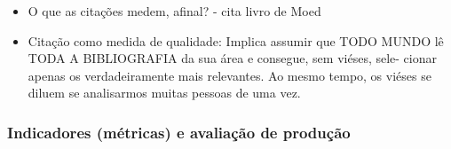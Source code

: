 \documentclass[11pt]{article}
\begin{document}
\begin{itemize}
\item O que as citações medem, afinal? \cite{pendlebury2009} - cita livro de Moed \cite{moed2006}

\item Citação como medida de qualidade: Implica assumir que TODO MUNDO lê TODA A BIBLIOGRAFIA da sua área e consegue, sem viéses, sele- cionar apenas os verdadeiramente mais relevantes. Ao mesmo tempo, os viéses se diluem se analisarmos muitas pessoas de uma vez.
\end{itemize}


\subsubsection{Indicadores (métricas) e avaliação de produção}
\label{sec:org16fd035}
\end{document}
